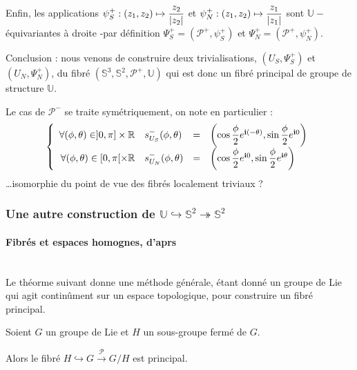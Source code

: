 \par
Enfin, les applications $\psi_S^+:(z_1,z_2)\mapsto\dfrac{z_2}{\lvert z_2\rvert}$ et $\psi_N^+:(z_1,z_2)\mapsto\dfrac{z_1}{\lvert z_1\rvert}$ sont $\mathbb{U}-$\'equivariantes \`a droite %
-par d\'efinition $\Psi_S^+=(\mathcal{P}^+,\psi_S^+)$ et $\Psi_N^+=(\mathcal{P}^+,\psi_N^+)$.

\ligneinter
Conclusion : nous venons de construire deux trivialisations, $(U_S,\Psi_S^+)$ et $(U_N,\Psi_N^+)$, du fibr\'e $(\mathbb{S}^3,\mathbb{S}^2,\mathcal{P}^+,\mathbb{U})$ %
qui est donc un fibr\'e principal de groupe de structure $\mathbb{U}$.

\etoile
Le cas de $\mathcal{P}^-$ se traite sym\'etriquement, on note en particulier :
\[\left\{\begin{array}{rlcl}%
\forall (\phi,\theta)\in ]0,\pi]\times\mathbb{R}&\se{S}{-}(\phi ,\theta )&=&\st{\phi}{(-\theta )}{0}\\%
\forall (\phi,\theta)\in [0,\pi [\times\mathbb{R}&\se{N}{-}(\phi ,\theta )&=&\st{\phi}{0}{\theta}\\%
\end{array}\right.\]
\dots isomorphie du point de vue des fibr\'es localement triviaux ?

\subsubsection{Une autre construction de $\mathbb{U}\hookrightarrow\mathbb{S}^2\twoheadrightarrow\mathbb{S}^2$}

\paragraph{Fibr\'es et espaces homognes, d'aprs \cite{ex_par}}~\\


Le th\'eorme suivant donne une m\'ethode g\'en\'erale, \'etant donn\'e un groupe de Lie qui agit contin\^ument sur un espace topologique, %
pour construire un fibr\'e principal.

\begin{theo}%
\label{esh}
Soient $G$ un groupe de Lie et $H$ un sous-groupe ferm\'e de $G$.

\par
Alors le fibr\'e $H\hookrightarrow G\xrightarrow{\mathcal{P}}G/H$ est principal.
\end{theo}


